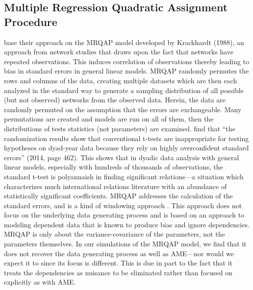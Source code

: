\subsection*{Multiple Regression Quadratic Assignment Procedure}

\citet{erikson:pinto:2014} base their approach on the MRQAP model developed by 
Krackhardt (1988), \nocite{krackhart:1988} an approach from network studies that draws upon the fact that networks have repeated observations. This induces correlation of observations thereby leading to bias in standard errors in general linear models. MRQAP randomly permutes the rows and columns of the data, creating multiple datasets which are then each analyzed in the standard way to generate a sampling distribution of all possible (but not observed) networks from the observed data. Herein, the data are randomly permuted on the assumption that the errors are exchangeable.  Many permutations are created and models are run on all of them, then the distributions of tests statistics (not parameters) are examined. \citet{erikson:pinto:2014} find  that ``the randomization results show that conventional t-tests are inappropriate for
testing hypotheses on dyad-year data because they rely on highly overconfident standard errors'' (2014, page 462).  This shows that in dyadic data analysis with general linear models, especially with hundreds of thousands of observations, the standard t-test is polyannaish in finding significant relations---a situation which characterizes much international relations literature with an abundance of statistically significant coefficients. MRQAP addresses the calculation of the standard errors, and is a kind of windowing approach \citep{heagerty:lumley:2000,heagerty:etal:2002}. This approach does not focus on the underlying data generating process and is based on an approach to modeling dependent data that is known to produce bias and ignore dependencies. MRQAP is only about the variance-covariance of the parameters, not the parameters themselves.  In our simulations of the MRQAP model, we find that it does not recover the data generating process as well as AME---nor would we expect it to since its focus is different. This is due in part to the fact that it treats the dependencies as nuisance to be eliminated rather than focused on explicitly as with AME. 

